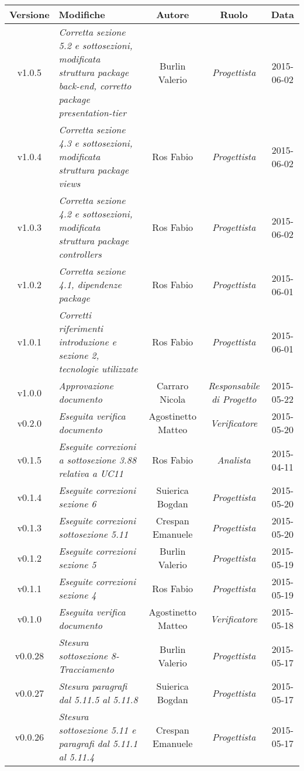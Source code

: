 \newpage

\begin{table}[h]
\centering
\begin{tabular}{|c|p{}|c|c|c|}
	\toprule
	\textbf{Versione} & \textbf{Modifiche} & \textbf{Autore} & \textbf{Ruolo} & \textbf{Data} \\
	\midrule
	\midrule
		v1.0.5 & \textit{Corretta sezione 5.2 e sottosezioni, modificata struttura package back-end, corretto package presentation-tier} & Burlin Valerio & \textit{Progettista} & 2015-06-02\\
	\midrule
		v1.0.4 & \textit{Corretta sezione 4.3 e sottosezioni, modificata struttura package views} & Ros Fabio & \textit{Progettista} & 2015-06-02\\
	\midrule
	v1.0.3 & \textit{Corretta sezione 4.2 e sottosezioni, modificata struttura package controllers} & Ros Fabio & \textit{Progettista} & 2015-06-02\\
	\midrule
	v1.0.2 & \textit{Corretta sezione 4.1, dipendenze package} & Ros Fabio & \textit{Progettista} & 2015-06-01\\
	\midrule
		v1.0.1 & \textit{Corretti riferimenti introduzione e sezione 2, tecnologie utilizzate} & Ros Fabio & \textit{Progettista} & 2015-06-01\\
	\midrule
		v1.0.0 & \textit{Approvazione documento} & Carraro Nicola & \textit{Responsabile di Progetto} & 2015-05-22\\
	\midrule
		v0.2.0 & \textit{Eseguita verifica documento} & Agostinetto Matteo & \textit{Verificatore} & 2015-05-20\\
	\midrule
		v0.1.5 & \textit{Eseguite correzioni a sottosezione 3.88 relativa a UC11} & Ros Fabio & \textit{Analista} & 2015-04-11\\
	\midrule
		v0.1.4 & \textit{Eseguite correzioni sezione 6} & Suierica Bogdan & \textit{Progettista} & 2015-05-20\\
	\midrule
		v0.1.3 & \textit{Eseguite correzioni sottosezione 5.11} & Crespan Emanuele & \textit{Progettista} & 2015-05-20\\
	\midrule
		v0.1.2 & \textit{Eseguite correzioni sezione 5} & Burlin Valerio & \textit{Progettista} & 2015-05-19\\
	\midrule
		v0.1.1 & \textit{Eseguite correzioni sezione 4} & Ros Fabio & \textit{Progettista} & 2015-05-19\\
	\midrule
		v0.1.0 & \textit{Eseguita verifica documento} & Agostinetto Matteo & \textit{Verificatore} & 2015-05-18\\
	\midrule
		v0.0.28 & \textit{Stesura sottosezione 8-Tracciamento} & Burlin Valerio & \textit{Progettista} & 2015-05-17\\
	\midrule
		v0.0.27 & \textit{Stesura paragrafi dal 5.11.5 al 5.11.8} & Suierica Bogdan & \textit{Progettista} & 2015-05-17\\
	\midrule
		v0.0.26 & \textit{Stesura sottosezione 5.11 e paragrafi dal 5.11.1 al 5.11.4} & Crespan Emanuele & \textit{Progettista} & 2015-05-17\\
	\bottomrule
\end{tabular}
\end{table}

